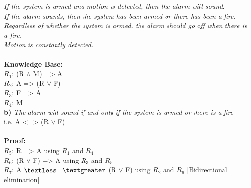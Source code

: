 {\it If the system is armed and motion is detected, then the alarm will sound.}\\
{\it If the alarm sounds, then the system has been armed or there has been a fire.}\\
{\it Regardless of whether the system is armed, the alarm should go off when there is a fire.}\\
{\it Motion is constantly detected.}\\
\\
{\bf Knowledge Base: }\\
$R_1$: (R ${\wedge }$ M)  ={\textgreater } A \\
$R_2$: A  ={\textgreater } (R ${\vee}$ F) \\
$R_3$: F ={\textgreater } A \\
$R_4$: M \\

{\bf b) }{\it The alarm will sound if and only if the system is armed or there is a fire} \\i.e.
A {\textless }={\textgreater } (R ${\vee}$ F) \\ \\
{\bf Proof:}\\
$R_5$: R ={\textgreater } A using $R_1$ and $R_4$\\
$R_6$: (R ${\vee }$ F) ={\textgreater } A using $R_3$ and $R_5$\\
$R_7$: A ${\textless }$=${\textgreater }$ (R ${\vee}$ F) using $R_2$ and $R_6$ [Bidirectional elimination]\\

